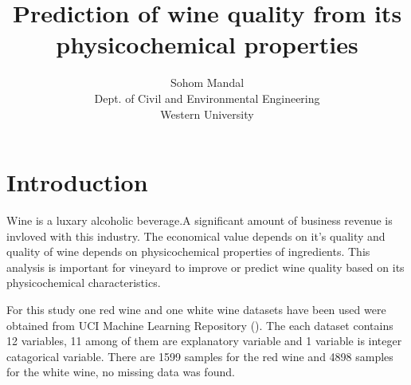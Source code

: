 \documentclass[12pt]{article}
\begin{document}
%
\title{Prediction of wine quality from its physicochemical properties}
\author{\small{Sohom Mandal} \\
\small{Dept. of Civil and Environmental Engineering}\\
\small{Western University}}
\date{}
\maketitle


 \section{Introduction}
Wine is a luxary alcoholic beverage.A significant amount of business revenue is invloved with this industry.
The economical value depends on it's quality and quality of wine depends on physicochemical properties of
ingredients.
This analysis is important for vineyard to improve or predict  wine quality based on its physicochemical
characteristics.

For this study one red wine and one white wine datasets have been used were obtained from UCI Machine Learning
Repository (\cite{Cortez}).
The each dataset contains 12 variables, 11 among of them are explanatory variable and 1 variable is integer
catagorical variable.
There are 1599 samples for the red wine and 4898 samples for the white wine, no missing data was found.
\end{document}
